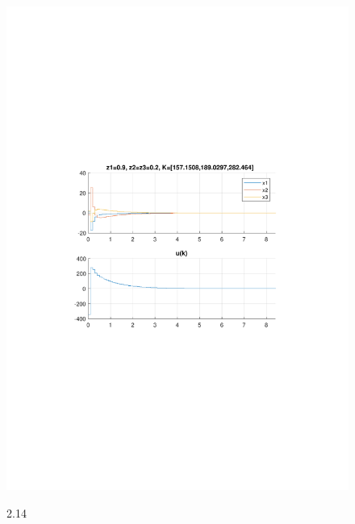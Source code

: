 \documentclass{article}
\begin{document}
{\begin{figure}[H]
\includegraphics[clip, trim=0.5cm 9.5cm 0.5cm 9.5cm, width=1.00\textwidth]{../rys/zad3b_rys14.pdf}
\label{fig:rys3.2.14}
\caption{2.14}
\end{figure}
}
\end{document}
